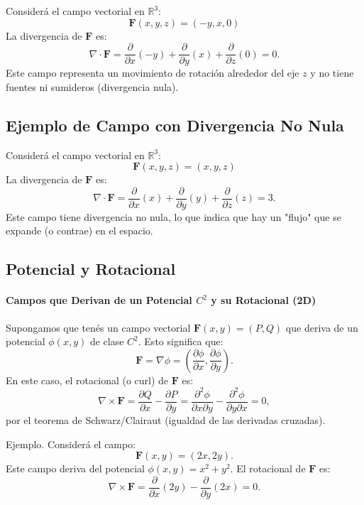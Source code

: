 \documentclass[11pt]{book}
\theoremstyle{definicion}
\theoremstyle{teorema}
\theoremstyle{ejemplo}
\begin{document}
\noindent
Considerá el campo vectorial en \(\mathbb{R}^3\):
\[
\mathbf{F}(x, y, z) = (-y, x, 0)
\]
La divergencia de \(\mathbf{F}\) es:
\[
\nabla \cdot \mathbf{F} = \frac{\partial}{\partial x}(-y) + \frac{\partial}{\partial y}(x) + \frac{\partial}{\partial z}(0) = 0.
\]
Este campo representa un movimiento de rotación alrededor del eje \(z\) y no tiene fuentes ni sumideros (divergencia nula).

\subsection{Ejemplo de Campo con Divergencia No Nula}

\noindent Considerá el campo vectorial en \(\mathbb{R}^3\):
\[
\mathbf{F}(x, y, z) = (x, y, z)
\]
La divergencia de \(\mathbf{F}\) es:
\[
\nabla \cdot \mathbf{F} = \frac{\partial}{\partial x}(x) + \frac{\partial}{\partial y}(y) + \frac{\partial}{\partial z}(z) = 3.
\]
Este campo tiene divergencia no nula, lo que indica que hay un "flujo" que se expande (o contrae) en el espacio.

\subsection{Potencial y Rotacional}

\paragraph{Campos que Derivan de un Potencial \(C^2\) y su Rotacional (2D)}

\noindent Supongamos que tenés un campo vectorial \(\mathbf{F}(x, y) = (P, Q)\) que deriva de un potencial \(\phi(x, y)\) de clase \(C^2\). Esto significa que:
\[
\mathbf{F} = \nabla \phi = \left( \frac{\partial \phi}{\partial x}, \frac{\partial \phi}{\partial y} \right).
\]
En este caso, el rotacional (o curl) de \(\mathbf{F}\) es:
\[
\nabla \times \mathbf{F} = \frac{\partial Q}{\partial x} - \frac{\partial P}{\partial y} = \frac{\partial^2 \phi}{\partial x \partial y} - \frac{\partial^2 \phi}{\partial y \partial x} = 0,
\]
por el teorema de Schwarz/Clairaut (igualdad de las derivadas cruzadas).

\noindent Ejemplo.
Considerá el campo:
\[
\mathbf{F}(x, y) = (2x, 2y).
\]
Este campo deriva del potencial \(\phi(x, y) = x^2 + y^2\). El rotacional de \(\mathbf{F}\) es:
\[
\nabla \times \mathbf{F} = \frac{\partial}{\partial x}(2y) - \frac{\partial}{\partial y}(2x) = 0.
\]
\end{document}
